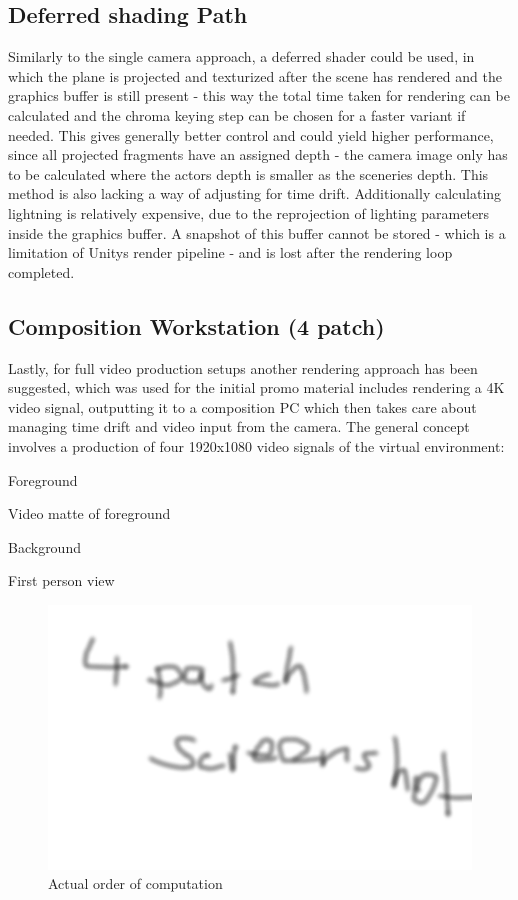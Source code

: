 \subsection{Deferred shading Path}

Similarly to the single camera approach, a deferred shader could be used, in 
which the plane is projected and texturized after the scene has rendered and 
the graphics buffer is still present - this way the total time taken for 
rendering can be calculated and the chroma keying step can be chosen for a 
faster variant if needed. This gives generally better control and could yield 
higher performance, since all projected fragments have an assigned depth - the 
camera image only has to be calculated where the actors depth is smaller as the 
sceneries depth. This method is also lacking a way of adjusting for time drift. 
Additionally calculating lightning is relatively expensive, due to the 
reprojection of lighting parameters inside the graphics buffer. A snapshot of 
this buffer cannot be stored - which is a limitation of Unitys render pipeline 
- and is lost after the rendering loop completed.

\subsection{Composition Workstation (4 patch)}

Lastly, for full video production setups another rendering approach has been 
suggested, which was used for the initial promo material 
\cite{valve:vive-trailer:2016} includes rendering a 4K video signal, outputting 
it to a composition PC which then takes care about managing time drift and 
video input from the camera.
\newline
The general concept involves a production of four 1920x1080 video signals of 
the virtual environment:
\begin{my_list}
	\item Foreground
	\item Video matte of foreground
	\item Background
	\item First person view
\end{my_list}

\begin{figure}[htb]
	\includegraphics[width=\textwidth]{_raw_resources/4patch_composite.png}
	\caption{Actual order of computation}
	\label{fig:alt-render:4patch}
\end{figure}

